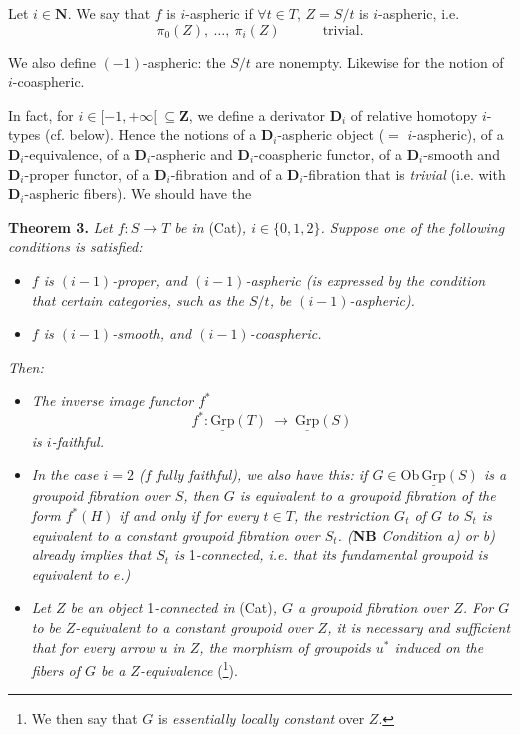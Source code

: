 \documentclass[11pt]{article}
\newcommand{\printedpage}[1]{\marginpar{\footnotesize p.~#1}}
\newcommand{\msp}[1]{\marginpar{\footnotesize [#1]}}
\newcommand{\uGrp}{\underline{\mathrm{Grp}}}
\newcommand{\fl}{\longrightarrow}
\begin{document}
\msp{page 8}
Let $i \in \mathbf{N}$. We say that $f$ is $i$-aspheric if $\forall t \in T$, $Z = S/t$ is $i$-aspheric, i.e.
\[
\pi_0(Z),\ \dots,\ \pi_i(Z) \qquad\quad \text{trivial.}
\tag*{$(*)$}
\]

We also define $(-1)$-aspheric: the $S/t$ are nonempty. Likewise for the notion of $i$-coaspheric.

In fact, for $i \in [-1,+\infty[ \ \subseteq \mathbf{Z}$, we define a derivator $\mathbf{D}_i$ of relative homotopy $i$-types (cf. below). Hence the notions of a $\mathbf{D}_i$-aspheric object ($=$ $i$-aspheric), of a $\mathbf{D}_i$-equivalence, of a $\mathbf{D}_i$-aspheric and $\mathbf{D}_i$-coaspheric functor, of a $\mathbf{D}_i$-smooth and $\mathbf{D}_i$-proper functor, of a $\mathbf{D}_i$-fibration and of a $\mathbf{D}_i$-fibration that is \textit{trivial} (i.e. with $\mathbf{D}_i$-aspheric fibers). We should have the

\textbf{Theorem 3.} \textit{Let $f : S \fl T$ be in} (Cat)\textit{, $i \in \{0,1,2\}$. Suppose one of the following conditions is satisfied:}

\begin{itemize}[leftmargin=3em]
\item[\textit{a)}] \textit{$f$ is $(i-1)$-proper, and $(i-1)$-aspheric (is expressed by the condition that certain categories, such as the $S/t$, be $(i-1)$-aspheric).}
\item[\textit{b)}] \textit{$f$ is $(i-1)$-smooth, and $(i-1)$-coaspheric.}
\end{itemize}

\textit{Then:}

\begin{itemize}[leftmargin=3em]
\item[\textit{1\textsuperscript{o})}] \textit{The inverse image functor $f^*$}
\[
f^* : \uGrp(T) \ \fl\ \uGrp(S)
\]
\textit{is $i$-faithful.}
\item[\textit{2\textsuperscript{o})}] \textit{In the case $i = 2$ ($f$ fully faithful), we}
\printedpage{8}
\msp{page 9}
\textit{also have this: if $G \in \mathrm{Ob}\,\uGrp(S)$ is a groupoid fibration over $S$, then $G$ is equivalent to a groupoid fibration of the form $f^*(H)$ if and only if for every $t \in T$, the restriction $G_t$ of $G$ to $S_t$ is equivalent to a constant groupoid fibration over $S_t$. (}\textbf{NB} \textit{Condition a) or b) already implies that $S_t$ is} 1\textit{-connected, i.e. that its fundamental groupoid is equivalent to $e$.)}
\item[\textit{3\textsuperscript{o})}] \textit{Let $Z$ be an object} 1\textit{-connected in} (Cat)\textit{, $G$ a groupoid fibration over $Z$. For $G$ to be $Z$-equivalent to a constant groupoid over $Z$, it is necessary and sufficient that for every arrow $u$ in $Z$, the morphism of groupoids $u^*$ induced on the fibers of $G$ be a $Z$-equivalence} (\footnote[3]{We then say that $G$ is \textit{essentially locally constant} over $Z$.}).
\end{itemize}
\end{document}
